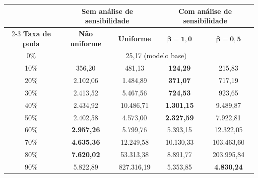\begin{tabular}{c cc cc}
\hline
& \multicolumn{2}{c}{\textbf{Sem análise de sensibilidade}} & \multicolumn{2}{c}{\textbf{Com análise de sensibilidade}} \\
\cline{2-3} \cline{4-5}
\textbf{Taxa de poda} & \textbf{Não uniforme} & \textbf{Uniforme} & $\boldsymbol{\beta = 1{,}0}$ & $\boldsymbol{\beta = 0{,}5}$ \\
\hline
0\% & \multicolumn{4}{c}{25,17 (modelo base)} \\
10\% & 356,20 & 481,13 & \textbf{124,29} & 215,83 \\
20\% & 2.102,06 & 1.484,89 & \textbf{371,07} & 717,19 \\
30\% & 2.413,52 & 5.467,56 & \textbf{724,53} & 923,65 \\
40\% & 2.434,92 & 10.486,71 & \textbf{1.301,15} & 9.489,87 \\
50\% & 2.402,58 & 4.573,00 & \textbf{2.327,59} & 7.922,81 \\
60\% & \textbf{2.957,26} & 5.799,76 & 5.393,15 & 12.322,05 \\
70\% & \textbf{4.635,36} & 12.249,58 & 10.130,33 & 103.463,60 \\
80\% & \textbf{7.620,02} & 53.313,38 & 8.891,77 & 203.995,84 \\
90\% & 5.822,89 & 827.316,19 & 5.353,85 & \textbf{4.830,24} \\
\hline
\end{tabular}
